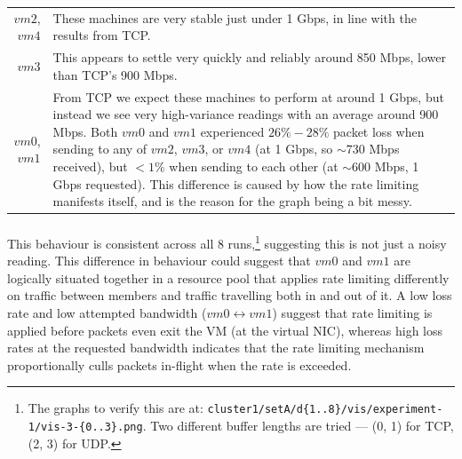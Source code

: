 \documentclass[a4paper,10pt]{article}
\begin{document}
\begin{table}[h]
    \centering
    \bgroup
    \def\arraystretch{1.5}%
    \begin{tabularx}{\textwidth}{r|X}
       $vm2$, $vm4$ & These machines are very stable just under 1 Gbps, in line with the results from TCP. \\
       $vm3$ & This appears to settle very quickly and reliably around 850 Mbps, lower than TCP's 900 Mbps. \\
       $vm0$, $vm1$ & From TCP we expect these machines to perform at around 1 Gbps, but instead we see very high-variance readings with an average around 900 Mbps. Both $vm0$ and $vm1$ experienced $26\%-28\%$ packet loss when sending to any of $vm2$, $vm3$, or $vm4$ (at 1 Gbps, so $\sim$730 Mbps received), but $<1\%$ when sending to each other (at $\sim$600 Mbps, 1 Gbps requested). This difference is caused by how the rate limiting manifests itself, and is the reason for the graph being a bit messy.
    \end{tabularx}
    \egroup
\end{table}

\vspace{-3mm}
\paragraph{} This behaviour is consistent across all 8 runs,\footnote{The graphs to verify this are at: \texttt{cluster1/setA/d\{1..8\}/vis/experiment-1/vis-3-\{0..3\}.png}. Two different buffer lengths are tried --- (0, 1) for TCP, (2, 3) for UDP.} suggesting this is not just a noisy reading. This difference in behaviour could suggest that $vm0$ and $vm1$ are logically situated together in a resource pool that applies rate limiting differently on traffic between members and traffic travelling both in and out of it. A low loss rate and low attempted bandwidth ($vm0 \leftrightarrow vm1$) suggest that rate limiting is applied before packets even exit the VM (at the virtual NIC), whereas high loss rates at the requested bandwidth indicates that the rate limiting mechanism proportionally culls packets in-flight when the rate is exceeded.
\end{document}
